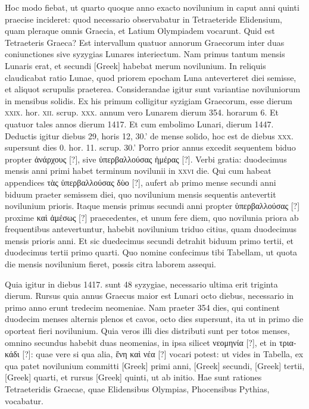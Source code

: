 Hoc modo fiebat, ut quarto quoque anno exacto novilunium
in caput anni quinti praecise incideret: quod necessario observabatur
in Tetraeteride Elidensium, quam pleraque omnis Graecia,
et Latium Olympiadem vocarunt.
Quid est Tetraeteris Graeca?
Est
intervallum quatuor annorum Graecorum inter duas coniunctiones sive
syzygias Lunares interiectum.
Nam primus tantum mensis Lunaris
erat, et secundi \textgreek{[Greek]} habebat merum novilunium.
In reliquis
claudicabat ratio Lunae, quod priorem epocham Luna anteverteret
diei semisse, et aliquot scrupulis praeterea.
Considerandae igitur sunt
variantiae noviluniorum in mensibus solidis.
Ex his primum colligitur
syzigiam Graecorum, esse dierum \textsc{xxix}.
 hor. \textsc{xii}. scrup. \textsc{xxx}. annum
vero Lunarem dierum 354. horarum 6.
Et quatuor tales annos dierum
1417.
Et cum embolimo Lunari, dierum 1447.
Deductis igitur
diebus 29, horis 12, 30.' de mense solido, hoc est de diebus \textsc{xxx}.
supersunt dies 0. hor. 11. scrup. 30.'
Porro prior annus excedit sequentem
biduo propter \textgreek{ἀνάρχους [?]},
 sive \textgreek{ὑπερβαλλούσας ἡμέρας [?]}.
Verbi gratia:
duodecimus mensis anni primi habet terminum novilunii in \textsc{xxvi}
die.
Qui cum habeat appendices \textgreek{τὰς ὑπερβαλλούσας δὺο [?]},
 aufert ab primo
mense secundi anni biduum praeter semissem diei, quo novilunium
mensis sequentis antevertit novilunium prioris.
Itaque mensis primus
secundi anni propter \textgreek{ὑπερβαλλούσας [?]} proxime
 \textgreek{καὶ ἀμέσως [?]} praecedentes, et unum
fere diem, quo novilunia priora ab frequentibus antevertuntur, habebit
novilunium triduo citius, quam duodecimus mensis prioris anni.
Et sic duedecimus secundi detrahit biduum primo tertii, et duodecimus
tertii primo quarti.
Quo nomine confecimus tibi Tabellam, ut
quota die mensis novilunium fieret, possis citra laborem assequi.


Quia
igitur in diebus 1417. sunt 48 syzygiae, necessario
ultima erit triginta dierum.
Rursus quia annus
Graecus maior est Lunari octo diebus, necessario
in primo anno erunt tredecim neomeniae.
Nam
praeter 354 dies, qui continent duodecim menses
alternis plenos et cavos, octo dies supersunt, ita ut
in primo die oporteat fieri novilunium.
Quia veros
illi dies distributi sunt per totos menses, omnino
secundus habebit duas neomenias, in ipsa silicet
\textgreek{νεομηνία [?]}, et in \textgreek{τριακάδι [?]}: quae vere si qua alia,
\textgreek{ἔνη καὶ νέα [?]} vocari potest: ut vides in Tabella, ex qua
patet novilunium committi \textgreek{[Greek]} primi
anni, \textgreek{[Greek]} secundi, \textgreek{[Greek]}
tertii, \textgreek{[Greek]} quarti, et rursus \textgreek{[Greek]}
quinti, ut ab initio.
Hae sunt rationes Tetraeteridis Graecae,
quae Elidensibus Olympias, Phocensibus Pythias, vocabatur.

